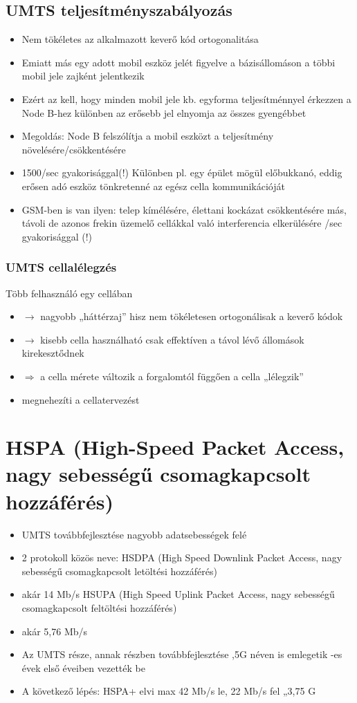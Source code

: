 \documentclass[10pt,a4paper]{article}
\begin{document}
\subsection{UMTS teljesítményszabályozás}
\begin{itemize}
	\item Nem tökéletes az alkalmazott keverő kód ortogonalitása
	\item Emiatt más egy adott mobil eszköz jelét figyelve a bázisállomáson a
	többi mobil jele zajként jelentkezik
	\item Ezért az kell, hogy minden mobil jele kb. egyforma teljesítménnyel
	érkezzen a Node B-hez
	\subitem különben az erősebb jel elnyomja az összes gyengébbet
	\item Megoldás: Node B felszólítja a mobil eszközt a teljesítmény
	növelésére/csökkentésére
	\item 1500/sec gyakorisággal(!)
	\subitem Különben pl. egy épület mögül előbukkanó, eddig erősen adó eszköz
	tönkretenné az egész cella kommunikációját
	\item GSM-ben is van ilyen:
	\subitem telep kímélésére, élettani kockázat csökkentésére
	\subitem más, távoli de azonos frekin üzemelő cellákkal való interferencia
	elkerülésére
	/sec gyakorisággal (!)
\end{itemize}
\subsubsection{UMTS cellalélegzés}
Több felhasználó egy cellában
\begin{itemize}
\item $\rightarrow$ nagyobb „háttérzaj”
\subitem hisz nem tökéletesen ortogonálisak a keverő kódok
\item $\rightarrow$ kisebb cella használható csak effektíven
\subitem a távol lévő állomások kirekesztődnek
\item $\Rightarrow$ a cella mérete változik a forgalomtól függően
\subitem a cella „lélegzik”
\item megnehezíti a cellatervezést
\end{itemize}
\section{HSPA (High-Speed Packet Access, nagy sebességű csomagkapcsolt hozzáférés)}
\begin{itemize}
	\item UMTS továbbfejlesztése nagyobb adatsebességek felé
	\item 2 protokoll közös neve:
	\subitem HSDPA (High Speed Downlink Packet Access, nagy sebességű
	csomagkapcsolt letöltési hozzáférés)
	\item akár 14 Mb/s
	\subitem HSUPA (High Speed Uplink Packet Access, nagy sebességű
	csomagkapcsolt feltöltési hozzáférés)
	\item akár 5,76 Mb/s
	\item Az UMTS része, annak részben továbbfejlesztése
	,5G néven is emlegetik
	-es évek első éveiben vezették be
	\item A következő lépés: HSPA+
	\subitem elvi max 42 Mb/s le, 22 Mb/s fel
	\subitem „3,75 G
\end{itemize}
\end{document}
